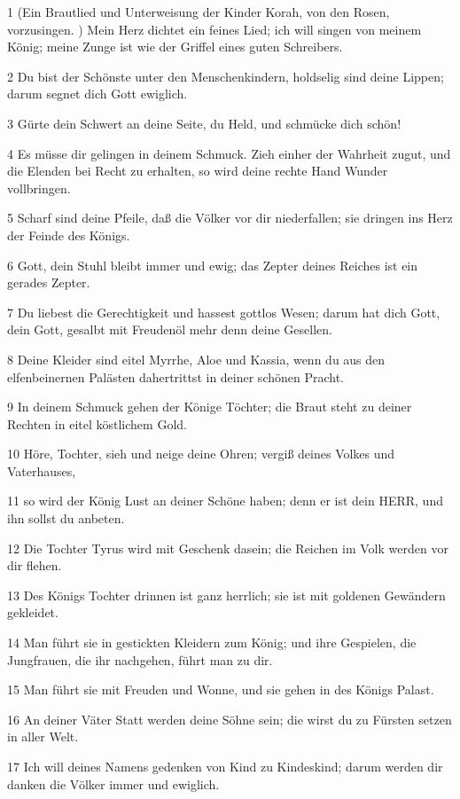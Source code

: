 \par 1 (Ein Brautlied und Unterweisung der Kinder Korah, von den Rosen, vorzusingen. ) Mein Herz dichtet ein feines Lied; ich will singen von meinem König; meine Zunge ist wie der Griffel eines guten Schreibers.
\par 2 Du bist der Schönste unter den Menschenkindern, holdselig sind deine Lippen; darum segnet dich Gott ewiglich.
\par 3 Gürte dein Schwert an deine Seite, du Held, und schmücke dich schön!
\par 4 Es müsse dir gelingen in deinem Schmuck. Zieh einher der Wahrheit zugut, und die Elenden bei Recht zu erhalten, so wird deine rechte Hand Wunder vollbringen.
\par 5 Scharf sind deine Pfeile, daß die Völker vor dir niederfallen; sie dringen ins Herz der Feinde des Königs.
\par 6 Gott, dein Stuhl bleibt immer und ewig; das Zepter deines Reiches ist ein gerades Zepter.
\par 7 Du liebest die Gerechtigkeit und hassest gottlos Wesen; darum hat dich Gott, dein Gott, gesalbt mit Freudenöl mehr denn deine Gesellen.
\par 8 Deine Kleider sind eitel Myrrhe, Aloe und Kassia, wenn du aus den elfenbeinernen Palästen dahertrittst in deiner schönen Pracht.
\par 9 In deinem Schmuck gehen der Könige Töchter; die Braut steht zu deiner Rechten in eitel köstlichem Gold.
\par 10 Höre, Tochter, sieh und neige deine Ohren; vergiß deines Volkes und Vaterhauses,
\par 11 so wird der König Lust an deiner Schöne haben; denn er ist dein HERR, und ihn sollst du anbeten.
\par 12 Die Tochter Tyrus wird mit Geschenk dasein; die Reichen im Volk werden vor dir flehen.
\par 13 Des Königs Tochter drinnen ist ganz herrlich; sie ist mit goldenen Gewändern gekleidet.
\par 14 Man führt sie in gestickten Kleidern zum König; und ihre Gespielen, die Jungfrauen, die ihr nachgehen, führt man zu dir.
\par 15 Man führt sie mit Freuden und Wonne, und sie gehen in des Königs Palast.
\par 16 An deiner Väter Statt werden deine Söhne sein; die wirst du zu Fürsten setzen in aller Welt.
\par 17 Ich will deines Namens gedenken von Kind zu Kindeskind; darum werden dir danken die Völker immer und ewiglich.

